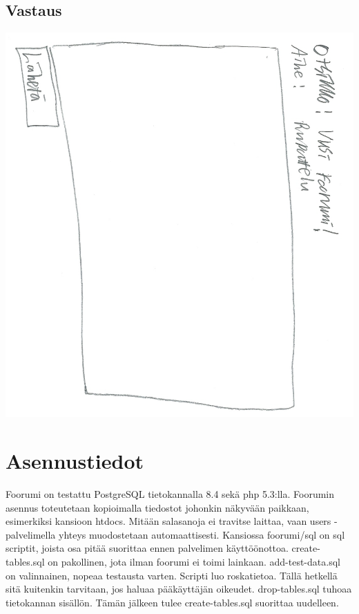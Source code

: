 \documentclass[a4paper, 12pt, finnish]{article}
\begin{document}
\subsection{Vastaus}
\includegraphics[width=\textwidth,height=\textheight,keepaspectratio]{vastaus.png}

\newpage

\section{Asennustiedot}
Foorumi on testattu PostgreSQL tietokannalla 8.4 sekä php 5.3:lla.
Foorumin asennus toteutetaan kopioimalla tiedostot johonkin näkyvään paikkaan, esimerkiksi kansioon htdocs.
Mitään salasanoja ei travitse laittaa, vaan users -palvelimella yhteys muodostetaan automaattisesti.
Kansiossa foorumi/sql on sql scriptit, joista osa pitää suorittaa ennen palvelimen käyttöönottoa.
create-tables.sql on pakollinen, jota ilman foorumi ei toimi lainkaan.
add-test-data.sql on valinnainen, nopeaa testausta varten.
Scripti luo roskatietoa.
Tällä hetkellä sitä kuitenkin tarvitaan, jos haluaa pääkäyttäjän oikeudet.
drop-tables.sql tuhoaa tietokannan sisällön. Tämän jälkeen tulee create-tables.sql suorittaa uudelleen.
\end{document}
